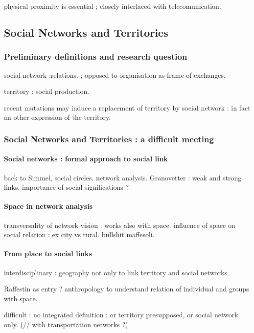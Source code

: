 physical proximity is essential ; closely interlaced with telecomunication.


\subsection{Social Networks and Territories}


\subsubsection*{Preliminary definitions and research question}

social network :relations. ; opposed to organisation as frame of exchanges.

territory : social production.

recent mutations may induce a replacement of territory by social network : in fact an other expression of the territory.

\subsubsection*{Social Networks and Territories : a difficult meeting}

\paragraph{Social networks : formal approach to social link}

back to Simmel, social circles.  network analysis. Granovetter : weak and strong links. importance of social significations ?

\paragraph{Space in network analysis}

transversality of network vision : works also with space. influence of space on social relation : ex city vs rural. bullshit maffesoli.

\paragraph{From place to social links}

interdisciplinary : geography not only to link territory and social networks.

Raffestin as entry ? anthropology to understand relation of individual and groups with space.

difficult : no integrated definition : or territory presupposed, or social network only. (// with transportation networks ?)


